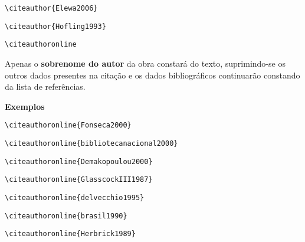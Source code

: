 \begin{alineas}
\begin{verbatim}
\citeauthor{Elewa2006}
\end{verbatim}
\citeauthor{Elewa2006}

\begin{verbatim}
\citeauthor{Hofling1993}
\end{verbatim}
\citeauthor{Hofling1993}


\item
\begin{verbatim}
\citeauthoronline
\end{verbatim}

Apenas o \textbf{sobrenome do autor} da obra constar\'a do texto, suprimindo-se os outros dados presentes na citação e os dados bibliogr\'aficos continuarão constando da lista de refer\^encias.

\textbf{Exemplos}

\begin{verbatim}
\citeauthoronline{Fonseca2000}
\end{verbatim}

\begin{verbatim}
\citeauthoronline{bibliotecanacional2000}
\end{verbatim}

\begin{verbatim}
\citeauthoronline{Demakopoulou2000}
\end{verbatim}

\begin{verbatim}
\citeauthoronline{GlasscockIII1987}
\end{verbatim}

\begin{verbatim}
\citeauthoronline{delvecchio1995}
\end{verbatim}

\begin{verbatim}
\citeauthoronline{brasil1990}
\end{verbatim}

\begin{verbatim}
\citeauthoronline{Herbrick1989}
\end{verbatim}


\end{alineas}
